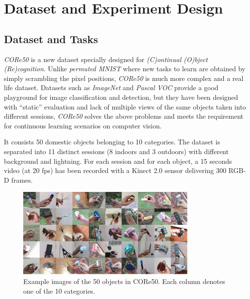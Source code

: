 \section{Dataset and Experiment Design}
\subsection{Dataset and Tasks}
\textit{CORe50} is a new dataset specially designed for \textit{(C)ontinual (O)bject (Re)cognition}. Unlike \textit{permuted MNIST}  where new tasks to learn are obtained by simply scrambling the pixel positions, \textit{CORe50} is much more complex and a real life dataset. Datasets such as \textit{ImageNet} and \textit{Pascal VOC} provide a good playground for image classification and detection, but they have been designed with “static” evaluation and lack of multiple views of the same objects taken into different sessions, \textit{CORe50} solves the above problems and meets the requirement for continuous learning scenarios on computer vision.

It consists 50 domestic objects belonging to 10 categories. The dataset is separated into 11 distinct sessions (8 indoors and 3 outdoors) with different background and lightning. For each session and for each object, a 15 seconds video (at 20 fps) has been recorded with a Kinect 2.0 sensor delivering 300 RGB-D frames. 
\begin{figure}[hp]
  \centering
  \includegraphics[width=0.8\textwidth]{figure/core50.png}
  \caption{Example images of the 50 objects in CORe50. Each column denotes one of the 10 categories.}
  \label{core50}
\end{figure}

